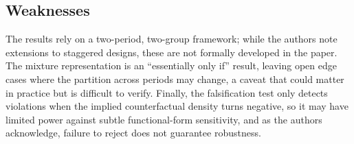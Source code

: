 \documentclass[12pt]{article}
\theoremstyle{remark}
\begin{document}
\subsection*{Weaknesses} The results rely on a two-period, two-group framework; while the authors note extensions to staggered designs, these are not formally developed in the paper. The mixture representation is an ``essentially only if'' result, leaving open edge cases where the partition across periods may change, a caveat that could matter in practice but is difficult to verify. Finally, the falsification test only detects violations when the implied counterfactual density turns negative, so it may have limited power against subtle functional-form sensitivity, and as the authors acknowledge, failure to reject does not guarantee robustness.\\


\vspace{-0.5cm} 



\end{document}
